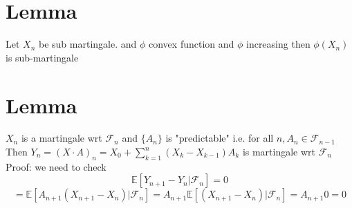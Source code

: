 \documentclass[11pt]{article}
\begin{document}
\section{Lemma}
Let $X_n$ be sub martingale. and  $\phi$ convex function and $\phi$ increasing then $\phi(X_n)$ is sub-martingale

\section{Lemma}
$X_n$ is a martingale wrt  $ \mathcal{F}_n$ and $\{A_n\}$ is "predictable" i.e. for all  $n, A_n \in \mathcal{F}_{n-1}$
Then $Y_n = (X \cdot A)_n= X_0 + \sum_{k=1}^{n}(X_k - X_{k-1})A_k$ is martingale wrt $ \mathcal{F}_n$ \\
Proof: we need to check
\[
    \mathbb{E}[Y_{n+1}- Y_n | \mathcal{F}_n] = 0
\] 
\[
    = \mathbb{E}[A_{n+1}(X_{n+1}-X_n) | \mathcal{F}_n] = A_{n+1} \mathbb{E}[(X_{n+1} - X_n) | \mathcal{F}_n] = A_{n+1} 0 = 0
\] 
\end{document}
